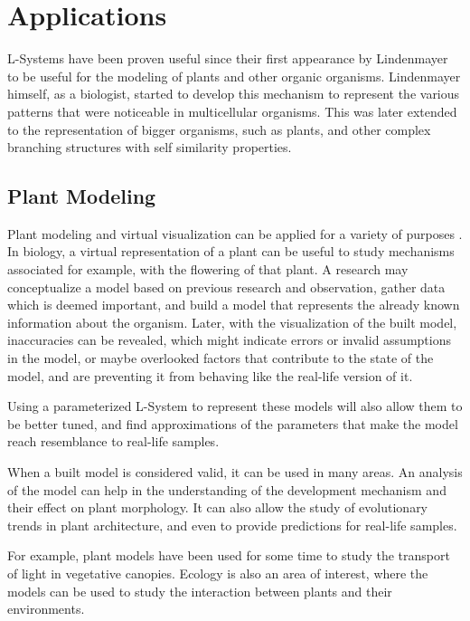 \documentclass{acmtog}
\begin{document}
\section{Applications}
\label{sec:applications}



L-Systems have been proven useful since their first appearance by Lindenmayer to be useful for the modeling of plants and other organic organisms. Lindenmayer himself, as a biologist, started to develop this mechanism to represent the various patterns that were noticeable in multicellular organisms. This was later extended to the representation of bigger organisms, such as plants, and other complex branching structures with self similarity properties.

\subsection{Plant Modeling}
\label{subsec:plant_modeling}

Plant modeling and virtual visualization can be applied for a variety of purposes \cite{hanan1992parametric}. In biology, a virtual representation of a plant can be useful to study mechanisms associated for example, with the flowering of that plant. A research may conceptualize a model based on previous research and observation, gather data which is deemed important, and build a model that represents the already known information about the organism. Later, with the visualization of the built model, inaccuracies can be revealed, which might indicate errors or invalid assumptions in the model, or maybe overlooked factors that contribute to the state of the model, and are preventing it from behaving like the real-life version of it.

Using a parameterized L-System to represent these models will also allow them to be better tuned, and find approximations of the parameters that make the model reach resemblance to real-life samples.

When a built model is considered valid, it can be used in many areas. An analysis of the model can help in the understanding of the development mechanism and their effect on plant morphology. It can also allow the study of evolutionary trends in plant architecture, and even to provide predictions for real-life samples.

For example, plant models have been used for some time to study the transport of light in vegetative canopies. Ecology is also an area of interest, where the models can be used to study the interaction between plants and their environments.
\end{document}
